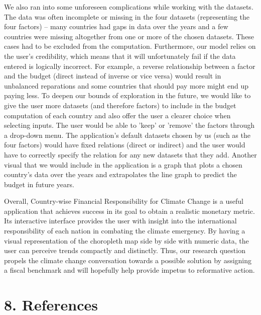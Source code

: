 \documentclass[fontsize=11pt]{article}
\begin{document}
    We also ran into some unforeseen complications while working with the datasets. The data was often incomplete or missing in the 
    four datasets (representing the four factors) – many countries had gaps in data over the years and a few countries were missing 
    altogether from one or more of the chosen datasets. These cases had to be excluded from the computation. Furthermore, our model 
    relies on the user’s credibility, which means that it will unfortunately fail if the data entered is logically incorrect. 
    For example, a reverse relationship between a factor and the budget (direct instead of inverse or vice versa) would result in 
    unbalanced reparations and some countries that should pay more might end up paying less. To deepen our bounds of exploration in the future, 
    we would like to give the user more datasets (and therefore factors) to include in the budget computation of each country 
    and also offer the user a clearer choice when selecting inputs. The user would be able to 'keep' or 'remove' the factors through a drop-down menu. 
    The application's default datasets chosen by us (such as the four factors) would have fixed relations (direct or indirect) 
    and the user would have to correctly specify the relation for any new datasets that they add. Another visual that we would include 
    in the application is a graph that plots a chosen country’s data over the years and extrapolates the line graph to predict the budget in future years.
    \newline
    
    Overall, Country-wise Financial Responsibility for Climate Change is a useful application that achieves success in its goal 
    to obtain a realistic monetary metric. Its interactive interface provides 
    the user with insight into the international responsibility of each nation in combating the climate emergency. By having a visual representation 
    of the choropleth map side by side with numeric data, the user can perceive trends compactly and distinctly. Thus, our research question 
    propels the climate change conversation towards a possible solution by assigning a fiscal benchmark and will hopefully 
    help provide impetus to reformative action.
    \newline

    \newpage

    \section*{8. References}
\end{document}
